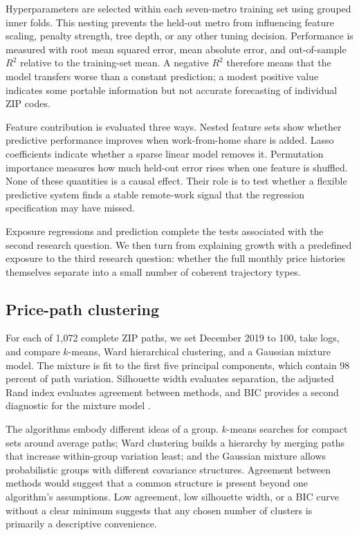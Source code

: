 \documentclass[11pt]{article}
\begin{document}
Hyperparameters are selected within each seven-metro training set using grouped inner folds. This nesting prevents the held-out
metro from influencing feature scaling, penalty strength, tree depth, or any other tuning decision. Performance is measured with
root mean squared error, mean absolute error, and out-of-sample $R^2$ relative to the training-set mean. A negative $R^2$ therefore
means that the model transfers worse than a constant prediction; a modest positive value indicates some portable information but
not accurate forecasting of individual ZIP codes.

Feature contribution is evaluated three ways. Nested feature sets show whether predictive performance improves when work-from-home
share is added. Lasso coefficients indicate whether a sparse linear model removes it. Permutation importance measures how much
held-out error rises when one feature is shuffled. None of these quantities is a causal effect. Their role is to test whether a
flexible predictive system finds a stable remote-work signal that the regression specification may have missed.

Exposure regressions and prediction complete the tests associated with the second research question. We then turn from explaining
growth with a predefined exposure to the third research question: whether the full monthly price histories themselves separate
into a small number of coherent trajectory types.

\subsection{Price-path clustering}

For each of 1,072 complete ZIP paths, we set December 2019 to 100, take logs, and compare $k$-means, Ward hierarchical clustering,
and a Gaussian mixture model. The mixture is fit to the first five principal components, which contain 98 percent of path
variation. Silhouette width evaluates separation, the adjusted Rand index evaluates agreement between methods, and BIC provides a
second diagnostic for the mixture model \cite{rousseeuw}.

The algorithms embody different ideas of a group. $k$-means searches for compact sets around average paths; Ward clustering builds
a hierarchy by merging paths that increase within-group variation least; and the Gaussian mixture allows probabilistic groups with
different covariance structures. Agreement between methods would suggest that a common structure is present beyond one
algorithm's assumptions. Low agreement, low silhouette width, or a BIC curve without a clear minimum suggests that any chosen
number of clusters is primarily a descriptive convenience.
\end{document}

